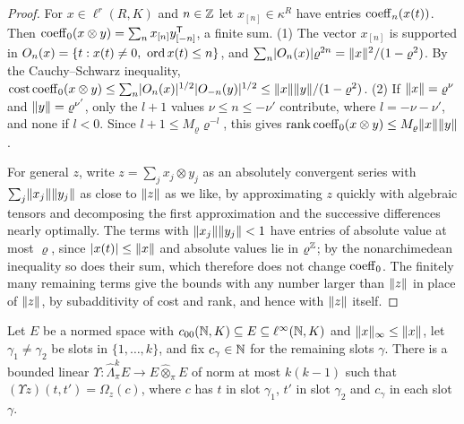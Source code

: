 \begin{proof}
For $x\in\ell^r(R,K)$ and $n\in\mathbb Z$ let $x_{[n]}\in\kappa^R$ have entries $\operatorname{coeff}_n(x(t))$. Then
$\operatorname{coeff}_0(x\otimes y)=\sum_nx_{[n]}y_{[-n]}^{\mathsf T}$, a finite sum.
(1) The vector $x_{[n]}$ is supported in $O_n(x)=\{t:x(t)\ne0,\ \operatorname{ord} x(t)\le n\}$, and
$\sum_n\lvert O_n(x)\rvert\varrho^{2n}=\lVert x\rVert^2/(1-\varrho^2)$. By the Cauchy--Schwarz inequality,
$\operatorname{cost}\operatorname{coeff}_0(x\otimes y)\le\sum_n\lvert O_n(x)\rvert^{1/2}\lvert O_{-n}(y)\rvert^{1/2}\le\lVert x\rVert\lVert y\rVert/(1-\varrho^2)$.
(2) If $\lVert x\rVert=\varrho^\nu$ and $\lVert y\rVert=\varrho^{\nu'}$, only the $l+1$ values $\nu\le n\le-\nu'$ contribute, where
$l=-\nu-\nu'$, and none if $l<0$. Since $l+1\le M_\varrho\varrho^{-l}$, this gives
$\operatorname{rank}\operatorname{coeff}_0(x\otimes y)\le M_\varrho\lVert x\rVert\lVert y\rVert$.

For general $z$, write $z=\sum_jx_j\otimes y_j$ as an absolutely convergent series with
$\sum_j\lVert x_j\rVert\lVert y_j\rVert$ as close to $\lVert z\rVert$ as we like, by approximating $z$ quickly with algebraic tensors and decomposing the
first approximation and the successive differences nearly optimally. The terms with $\lVert x_j\rVert\lVert y_j\rVert<1$ have
entries of absolute value at most $\varrho$, since $\lvert x(t)\rvert\le\lVert x\rVert$ and absolute values lie in $\varrho^\mathbb Z$; by
the nonarchimedean inequality so does their sum, which therefore does not change $\operatorname{coeff}_0$. The finitely many
remaining terms give the bounds with any number larger than $\lVert z\rVert$ in place of $\lVert z\rVert$, by subadditivity of cost
and rank, and hence with $\lVert z\rVert$ itself.
\end{proof}

\begin{lemma}\label{fib:lem:slice}
Let $E$ be a normed space with $c_{00}(\mathbb N,K)\subseteq E\subseteq\ell^\infty(\mathbb N,K)$ and $\lVert x\rVert_\infty\le\lVert x\rVert$, let
$\gamma_1\ne\gamma_2$ be slots in $\{1,\dots,k\}$, and fix $c_\gamma\in\mathbb N$ for the remaining slots $\gamma$. There is a
bounded linear $\Upsilon\colon\widehat\Lambda^k_\pi E\to E\widehat\otimes_\pi E$ of norm at most $k(k-1)$ such that
$(\Upsilon z)(t,t')=\Omega_z(c)$, where $c$ has $t$ in slot $\gamma_1$, $t'$ in slot $\gamma_2$ and $c_\gamma$ in each slot
$\gamma$.
\end{lemma}

